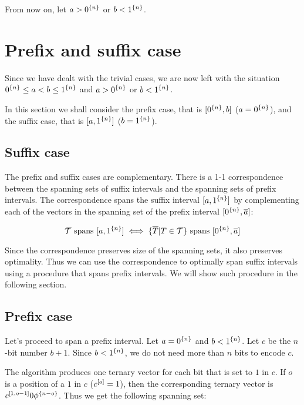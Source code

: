 From now on,
let $a > 0^{\{n\}}$ or $b < 1^{\{n\}}$.

\section{Prefix and suffix case}
\label{sec:prefixsuffix}

Since we have dealt with the trivial cases,
we are now left with the situation
$0^{\{n\}} \leq a < b \leq 1^{\{n\}}$
and
$a > 0^{\{n\}}$ or $b < 1^{\{n\}}$.

In this section we shall consider the prefix case,
that is $[0^{\{n\}}, b]$ ($a = 0^{\{n\}}$),
and the suffix case,
that is $[a, 1^{\{n\}}]$ ($b = 1^{\{n\}}$).

\subsection{Suffix case}

The prefix and suffix cases are complementary.
There is a 1-1
correspondence between
the spanning sets of suffix intervals
and the spanning sets
of prefix intervals.
The correspondence spans the suffix interval
$[a, 1^{\{n\}}]$
by complementing each of the vectors in the spanning set
of the prefix interval
$[0^{\{n\}}, \overline{a}]$:

\[
\mathcal{T} \text{ spans } [a, 1^{\{n\}}]
\iff
\{\overline{T} | T \in \mathcal{T}\}
\text{ spans } [0^{\{n\}}, \overline{a}]
\]

Since the correspondence preserves
size of the spanning sets,
it also preserves optimality.
Thus we can use the correspondence to optimally span
suffix intervals
using a procedure that spans prefix intervals.
We will show such procedure in the following section.

\subsection{Prefix case}
\label{sec:prefix}

Let's proceed to span a prefix interval.
Let $a = 0^{\{n\}}$ and $b < 1^{\{n\}}$.
Let $c$ be the $n$-bit number $b + 1$.
Since $b < 1^{\{n\}}$,
we do not need more than $n$ bits to encode $c$.

The algorithm produces one ternary vector
for each bit that is set to $1$ in $c$.
If $o$ is a position of a $1$ in $c$
($c^{[o]} = 1$),
then the corresponding ternary vector
is $c^{[1, o - 1]} 0 \phi^{\{n - o\}}$.
Thus we get the following spanning set:

